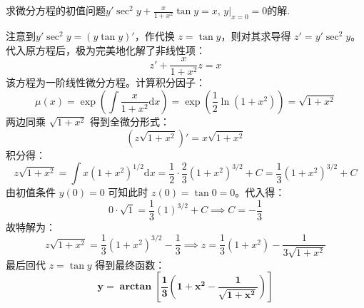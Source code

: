 \documentclass[lang=cn,11pt]{elegantbook}
\begin{document}
\begin{exercise}[一阶线性微分方程初值问题]
求微分方程的初值问题$\displaystyle y'\sec^2 y + \frac{x}{1+x^2}\tan y = x,\,y\big|_{x=0}=0$的解.
\end{exercise}
\begin{solution}
注意到$y'\sec^2 y=(y\tan y)'$，作代换 $z = \tan y$，则对其求导得 $z' = y'\sec^2 y$。代入原方程后，极为完美地化解了非线性项：
\[
z' + \frac{x}{1+x^2}z = x
\]
该方程为一阶线性微分方程。计算积分因子：
\[
\mu(x) = \exp\!\left(\int \frac{x}{1+x^2}\mathrm{d}x\right) = \exp\!\left(\frac{1}{2}\ln(1+x^2)\right) = \sqrt{1+x^2}
\]
两边同乘 $\sqrt{1+x^2}$ 得到全微分形式：
\[
(z\sqrt{1+x^2})' = x\sqrt{1+x^2}
\]
积分得：
\[
z\sqrt{1+x^2} = \int x(1+x^2)^{1/2}\mathrm{d}x = \frac{1}{2} \cdot \frac{2}{3}(1+x^2)^{3/2} + C = \frac{1}{3}(1+x^2)^{3/2} + C
\]
由初值条件 $y(0)=0$ 可知此时 $z(0) = \tan 0 = 0$。代入得：
\[
0 \cdot \sqrt{1} = \frac{1}{3}(1)^{3/2} + C \implies C = -\frac{1}{3}
\]
故特解为：
\[
z\sqrt{1+x^2} = \frac{1}{3}(1+x^2)^{3/2} - \frac{1}{3} \implies z = \frac{1}{3}(1+x^2) - \frac{1}{3\sqrt{1+x^2}}
\]
最后回代 $z = \tan y$ 得到最终函数：
\[
\mathbf{y = \arctan\!\left[ \frac{1}{3}\left(1+x^2 - \frac{1}{\sqrt{1+x^2}}\right) \right]}
\]
\end{solution}
\end{document}
